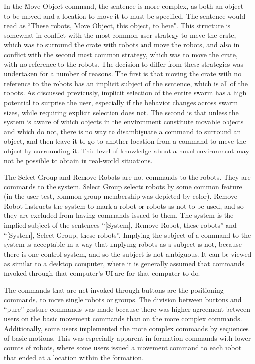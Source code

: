 In the Move Object command, the sentence is more complex, as both an object to be moved and a location to move it to must be specified. 
The sentence would read as ``These robots, Move Object, this object, to here". 
This structure is somewhat in conflict with the most common user strategy to move the crate, which was to surround the crate with robots and move the robots, and also in conflict with the second most common strategy, which was to move the crate, with no reference to the robots. 
The decision to differ from these strategies was undertaken for a number of reasons. 
The first is that moving the crate with no reference to the robots has an implicit subject of the sentence, which is all of the robots. 
As discussed previously, implicit selection of the entire swarm has a high potential to surprise the user, especially if the behavior changes across swarm sizes, while requiring explicit selection does not. 
The second is that unless the system is aware of which objects in the environment constitute movable objects and which do not, there is no way to disambiguate a command to surround an object, and then leave it to go to another location from a command to move the object by surrounding it.
This level of knowledge about a novel environment may not be possible to obtain in real-world situations. 

The Select Group and Remove Robots are not commands to the robots. 
They are commands to the system. 
Select Group selects robots by some common feature (in the user test, common group membership was depicted by color). 
Remove Robot instructs the system to mark a robot or robots as not to be used, and so they are excluded from having commands issued to them. 
The system is the implied subject of the sentences ``[System], Remove Robot, these robots'' and ``[System], Select Group, these robots''. 
Implying the subject of a command to the system is acceptable in a way that implying robots as a subject is not, because there is one control system, and so the subject is not ambiguous. 
It can be viewed as similar to a desktop computer, where it is generally assumed that commands invoked through that computer's UI are for that computer to do. 

The commands that are not invoked through buttons are the positioning commands, to move single robots or groups. 
The division between buttons and ``pure'' gesture commands was made because there was higher agreement between users on the basic movement commands than on the more complex commands. 
Additionally, some users implemented the more complex commands by sequences of basic motions. 
This was especially apparent in formation commands with lower counts of robots, where some users issued a movement command to each robot that ended at a location within the formation. 

